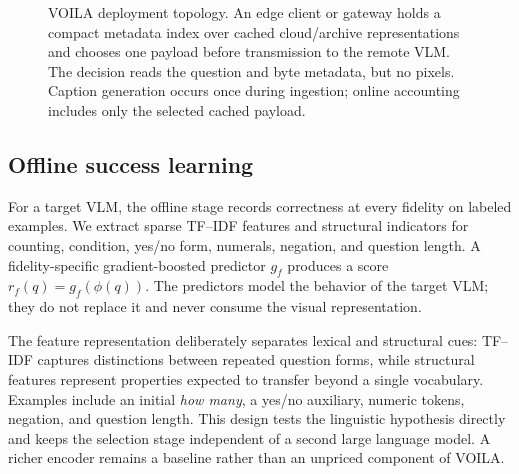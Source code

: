 \documentclass[10pt,conference]{IEEEtran}
\DeclareMathOperator*{\argmax}{arg\,max}
\newcommand{\system}{\textsc{VOILA}\xspace}
\begin{document}
\begin{figure}[t]
\centering
{}
\caption{\system deployment topology. An edge client or gateway holds a compact
metadata index over cached cloud/archive representations and chooses one payload
before transmission to the remote VLM. The decision reads the question and byte
metadata, but no pixels. Caption generation occurs once during ingestion; online
accounting includes only the selected cached payload.}
\label{fig:system}
\end{figure}

\subsection{Offline success learning}

For a target VLM, the offline stage records correctness at every fidelity on
labeled examples. We extract sparse TF--IDF features and structural indicators
for counting, condition, yes/no form, numerals, negation, and question length.
A fidelity-specific gradient-boosted predictor $g_f$ produces a score
$r_f(q)=g_f(\phi(q))$. The predictors model the behavior of the target VLM;
they do not replace it and never consume the visual representation.

The feature representation deliberately separates lexical and structural cues:
TF--IDF captures distinctions between repeated question forms, while
structural features represent properties expected to transfer beyond a single
vocabulary. Examples include an initial \emph{how many}, a yes/no auxiliary,
numeric tokens, negation, and question length. This design tests the linguistic
hypothesis directly and keeps the selection stage independent of a second
large language model. A richer encoder remains a baseline rather than an
unpriced component of \system.
\end{document}
